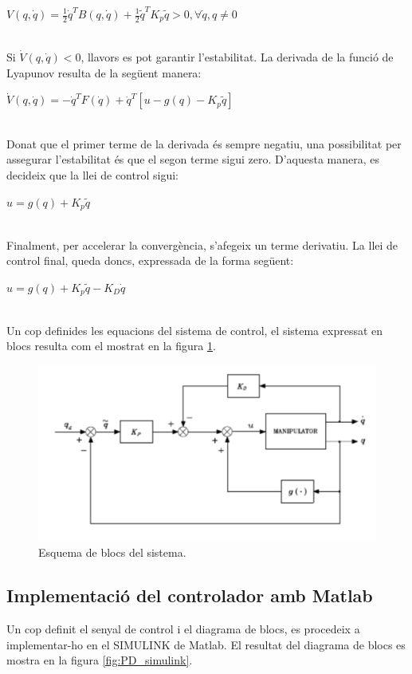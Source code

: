 \documentclass[]{article}
\begin{document}
\centerline{$V(q, \dot{q}) = \frac{1}{2}\dot{q}^TB(q,\dot{q}) +  \frac{1}{2}\tilde{q}^TK_{p}\tilde{q} > 0 , \forall\dot{q},q \neq 0$ } \leavevmode \\

Si $\dot{V}(q, \dot{q}) < 0$, llavors es pot garantir l'estabilitat. La derivada de la funció de Lyapunov resulta de la següent manera: \\

\centerline{$\dot{V}(q, \dot{q})= -\dot{q}^TF(\dot{q}) + \dot{q}^T[u - g(q) - K_{p}\tilde{q}]$} \leavevmode \\

Donat que el primer terme de la derivada és sempre negatiu, una possibilitat per assegurar l'estabilitat és que el segon terme sigui zero. D'aquesta manera, es decideix que la llei de control sigui: \\

\centerline{$u = g(q) + K_{p}\tilde{q}$} \leavevmode \\

Finalment, per accelerar la convergència, s'afegeix un terme derivatiu. La llei de control final, queda doncs, expressada de la forma següent: \\

\centerline{$u = g(q) + K_{p}\tilde{q} -K_{D}\dot{q}$} \leavevmode \\

Un cop definides les equacions del sistema de control, el sistema expressat en blocs resulta com el mostrat en la figura \ref{fig:PD_block_diagram}. \\

\begin{figure}[H]
\centering
    \includegraphics[width = 0.7\linewidth]{images/PD_gravity_compensation_Block_Diagram.png}
    \caption{Esquema de blocs del sistema.}
    \label{fig:PD_block_diagram}
\end{figure}

\subsection{Implementació del controlador amb Matlab}
Un cop definit el senyal de control i el diagrama de blocs, es procedeix a implementar-ho en el SIMULINK de Matlab. El resultat del diagrama de blocs es mostra en la figura \ref{fig:PD_simulink}. \\
\end{document}
